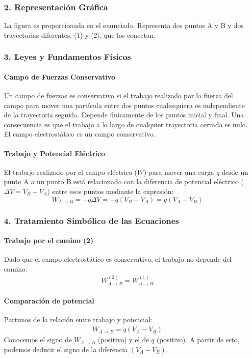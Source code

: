 \subsubsection*{2. Representación Gráfica}
La figura es proporcionada en el enunciado. Representa dos puntos A y B y dos trayectorias diferentes, (1) y (2), que los conectan.

\subsubsection*{3. Leyes y Fundamentos Físicos}
\paragraph*{Campo de Fuerzas Conservativo}
Un campo de fuerzas es conservativo si el trabajo realizado por la fuerza del campo para mover una partícula entre dos puntos cualesquiera es independiente de la trayectoria seguida. Depende únicamente de los puntos inicial y final. Una consecuencia es que el trabajo a lo largo de cualquier trayectoria cerrada es nulo. El campo electrostático es un campo conservativo.

\paragraph*{Trabajo y Potencial Eléctrico}
El trabajo realizado por el campo eléctrico ($W$) para mover una carga $q$ desde un punto A a un punto B está relacionado con la diferencia de potencial eléctrico ($\Delta V = V_B - V_A$) entre esos puntos mediante la expresión:
$$ W_{A \to B} = -q\Delta V = -q(V_B - V_A) = q(V_A - V_B) $$

\subsubsection*{4. Tratamiento Simbólico de las Ecuaciones}
\paragraph*{Trabajo por el camino (2)}
Dado que el campo electrostático es conservativo, el trabajo no depende del camino:
\begin{gather}
    W_{A \to B}^{(2)} = W_{A \to B}^{(1)}
\end{gather}
\paragraph*{Comparación de potencial}
Partimos de la relación entre trabajo y potencial:
\begin{gather}
    W_{A \to B} = q(V_A - V_B)
\end{gather}
Conocemos el signo de $W_{A \to B}$ (positivo) y el de $q$ (positivo). A partir de esto, podemos deducir el signo de la diferencia $(V_A - V_B)$.

